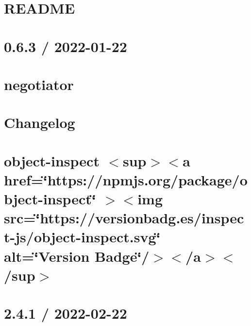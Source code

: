 \documentclass[twoside]{book}
\newcommand{\+}{\discretionary{\mbox{\scriptsize$\hookleftarrow$}}{}{}}
\begin{document}
\chapter{README}
\label{md_src_nodejs_node_modules_named_placeholders_README}

\chapter{0.6.3 / 2022-\/01-\/22}
\label{md_src_nodejs_node_modules_negotiator_HISTORY}

\chapter{negotiator}
\label{md_src_nodejs_node_modules_negotiator_README}

\chapter{Changelog}
\label{md_src_nodejs_node_modules_object_inspect_CHANGELOG}

\chapter{object-\/inspect \texorpdfstring{$<$}{<}sup\texorpdfstring{$>$}{>}\texorpdfstring{$<$}{<}a href=\char`\"{}https\+://npmjs.\+org/package/object-\/inspect\char`\"{} \texorpdfstring{$>$}{>}\texorpdfstring{$<$}{<}img src=\char`\"{}https\+://versionbadg.\+es/inspect-\/js/object-\/inspect.\+svg\char`\"{} alt=\char`\"{}\+Version Badge\char`\"{}/\texorpdfstring{$>$}{>}\texorpdfstring{$<$}{<}/a\texorpdfstring{$>$}{>}\texorpdfstring{$<$}{<}/sup\texorpdfstring{$>$}{>}}
\label{md_src_nodejs_node_modules_object_inspect_readme}

\chapter{2.4.1 / 2022-\/02-\/22}
\label{md_src_nodejs_node_modules_on_finished_HISTORY}

\end{document}
